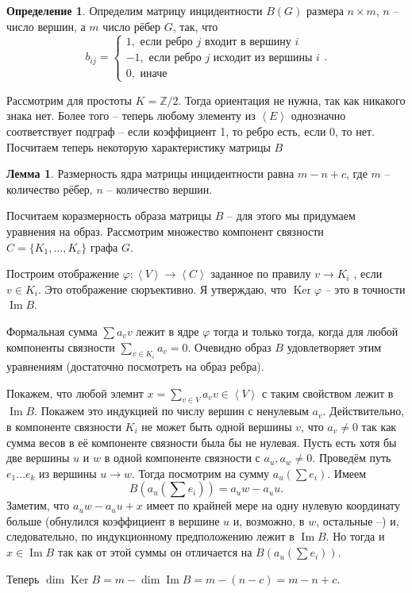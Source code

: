 \documentclass[10pt,a4paper,oneside]{book} %
\theoremstyle{definition}
\newtheorem*{defn}{Определение}
\newtheorem{lem}{Лемма}
\newcommand{\mb}[1]{\mathbb{#1}}
\DeclareMathOperator{\Ker}{Ker}
\renewcommand{\Im}{\operatorname{Im}}
\def\ffi{\varphi}
\def\lan{\left\langle }
\def\ran{\right\rangle}
\def\dfn{\begin{defn}}
\def\edfn{\end{defn}}
\def\lm{\begin{lem}}
\def\elm{\end{lem}}
\begin{document}
\dfn Определим матрицу инцидентности $B(G)$ размера $n\times m$, $n$ -- число вершин, а $m$ число рёбер $G$, так, что 
$$b_{ij}=\begin{cases} 1, \text{ если ребро $j$ входит в вершину $i$}\\
-1, \text{ если ребро $j$ исходит из вершины $i$}\\
0, \text{ иначе }
\end{cases}.$$
\edfn

Рассмотрим для простоты $K=\mb Z/2$. Тогда ориентация не нужна, так как никакого знака нет. Более того -- теперь любому элементу из $\lan E \ran $ однозначно соответствует подграф -- если коэффициент 1, то ребро есть, если 0, то нет. Посчитаем теперь некоторую характеристику матрицы $B$ 

\lm Размерность ядра матрицы инцидентности  равна $m-n+c$, где $m$ -- количество рёбер, $n$ -- количество вершин.
\elm
\proof Посчитаем коразмерность образа матрицы $B$ -- для этого мы придумаем уравнения на образ. Рассмотрим множество компонент связности  $C = \{ K_1,\dots,K_c\}$ графа $G$.

Построим отображение $\ffi \colon \lan V \ran \to \lan C \ran$ заданное по правилу $v \to K_i$ , если $v\in K_i$. Это отображение сюръективно. Я утверждаю, что $\Ker \ffi$ -- это в точности $\Im B$.

Формальная сумма $\sum a_v v$ лежит в ядре $\ffi$ тогда и только тогда, когда для любой компоненты связности $\sum_{v\in K_i} a_v=0$. Очевидно образ $B$ удовлетворяет этим  уравнениям (достаточно посмотреть на образ ребра).

Покажем, что любой элемнт $x= \sum_{v \in V} a_v v \in \lan V \ran$ с таким свойством лежит в $\Im B$. Покажем это индукцией по числу вершин с ненулевым $a_v$. Действительно, в компоненте связности $K_i$ не может быть одной вершины $v$, что $a_v\neq 0$ так как сумма весов в её компоненте связности была бы не нулевая.
Пусть есть хотя бы две вершины $u$ и $w$ в одной компоненте связности с $a_{u},a_{w}\neq 0$. Проведём путь $e_1\dots e_k$ из вершины $u \to w$. Тогда посмотрим на сумму $a_{u}(\sum e_i)$. Имеем $$B(a_{u}(\sum e_i))= a_{u}w - a_u u.$$
Заметим, что $a_{u}w - a_uu +x$ имеет по крайней мере на одну нулевую координату больше (обнулился коэффициент в вершине $u$ и, возможно, в $w$, остальные --) и, следовательно, по индукционному предположению лежит в $\Im B$. Но тогда и $x \in \Im B$ так как от этой суммы он отличается на $B(a_{u}(\sum e_i))$.

Теперь $\dim \Ker B = m - \dim \Im B= m - (n-c)= m-n +c$.
\endproof
\end{document}
